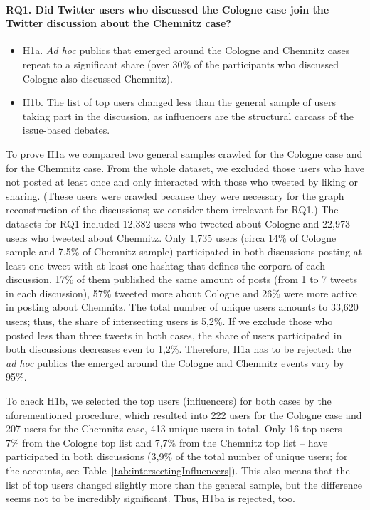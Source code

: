 \paragraph{RQ1. Did Twitter users who discussed the Cologne case join the Twitter discussion about the Chemnitz case?}

\begin{itemize}
	\item H1a. \textit{Ad hoc} publics that emerged around the Cologne and Chemnitz cases repeat to a significant share (over 30\% of the participants who discussed Cologne also discussed Chemnitz).
	\item H1b. The list of top users changed less than the general sample of users taking part in the discussion, as influencers are the structural carcass of the issue-based debates.
\end{itemize}

To prove H1a we compared two general samples crawled for the Cologne case and for the Chemnitz case. From the whole dataset, we excluded those users who have not posted at least once and only interacted with those who tweeted by liking or sharing. (These users were crawled because they were necessary for the graph reconstruction of the discussions; we consider them irrelevant for RQ1.) The datasets for RQ1 included 12,382 users who tweeted about Cologne and 22,973 users who tweeted about Chemnitz. Only 1,735 users (circa 14\% of Cologne sample and 7,5\% of Chemnitz sample) participated in both discussions posting at least one tweet with at least one hashtag that defines the corpora of each discussion. 17\% of them published the same amount of posts (from 1 to 7 tweets in each discussion), 57\% tweeted more about Cologne and 26\% were more active in posting about Chemnitz. The total number of unique users amounts to 33,620 users; thus, the share of intersecting users is 5,2\%. If we exclude those who posted less than three tweets in both cases, the share of users participated in both discussions decreases even to 1,2\%. Therefore, H1a has to be rejected: the \textit{ad hoc} publics the emerged around the Cologne and Chemnitz events vary by 95\%.

To check H1b, we selected the top users (influencers) for both cases by the aforementioned procedure, which resulted into 222 users for the Cologne case and 207 users for the Chemnitz case, 413 unique users in total. Only 16 top users -- 7\% from the Cologne top list and 7,7\% from the Chemnitz top list -- have participated in both discussions (3,9\% of the total number of unique users; for the accounts, see Table~\cref{tab:intersectingInfluencers}). This also means that the list of top users changed slightly more than the general sample, but the difference seems not to be incredibly significant. Thus, H1ba is rejected, too.

